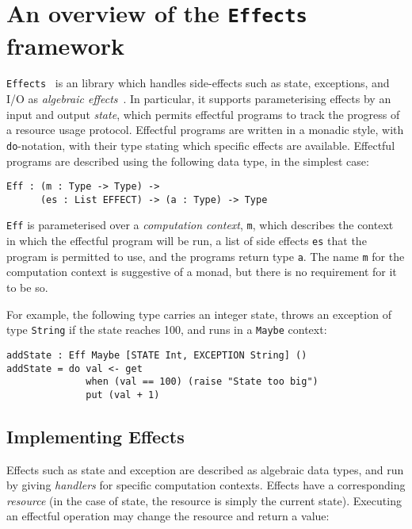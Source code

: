 \section{An overview of the \texttt{Effects} framework}
\label{effects}

\texttt{Effects}~\cite{brady:effects} is an \idris{} library which handles
side-effects such as state, exceptions, and I/O as \emph{algebraic
effects}~\cite{Plotkin2009}. In particular, it supports parameterising effects
by an input and output \emph{state}, which permits effectful programs to track
the progress of a resource usage protocol. Effectful programs are written
in a monadic style, with \texttt{do}-notation, with their type stating which
specific effects are available.
Effectful
programs are described using the following data type,
in the simplest case:

\begin{Verbatim}
Eff : (m : Type -> Type) ->
      (es : List EFFECT) -> (a : Type) -> Type
\end{Verbatim}

\texttt{Eff} is parameterised over a \emph{computation context}, \texttt{m}, 
which describes the context in which the effectful program will be run, a
list of side effects \texttt{es} that the program is permitted to use, and the
programs return type \texttt{a}. The name \texttt{m} for the computation context is
suggestive of a monad, but there is no requirement for it to be so.

For example, the following type carries an integer state,
throws an exception of type \texttt{String} if the state reaches 100, 
and runs in a \texttt{Maybe} context:

\begin{Verbatim}
addState : Eff Maybe [STATE Int, EXCEPTION String] ()
addState = do val <- get
              when (val == 100) (raise "State too big")
              put (val + 1)
\end{Verbatim}

\subsection{Implementing Effects}

Effects such as state and exception are described as algebraic data types,
and run by giving \emph{handlers} for specific computation contexts. 
Effects have a corresponding \emph{resource} (in the case of state, the
resource is simply the current state). Executing an effectful operation may
change the resource and return a value:

